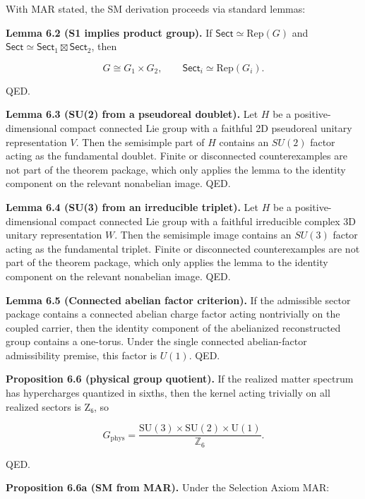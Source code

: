 With MAR stated, the SM derivation proceeds via standard lemmas:

\textbf{Lemma 6.2 (S1 implies product group).} If \(\mathsf{Sect} \simeq \mathrm{Rep}(G)\) and \(\mathsf{Sect} \simeq \mathsf{Sect}_1 \boxtimes \mathsf{Sect}_2\), then

\[
G \cong G_1 \times G_2,
\qquad
\mathsf{Sect}_i \simeq \mathrm{Rep}(G_i).
\]

QED.

\textbf{Lemma 6.3 (SU(2) from a pseudoreal doublet).} Let \(H\) be a positive-dimensional compact connected Lie group with a faithful 2D pseudoreal unitary representation \(V\). Then the semisimple part of \(H\) contains an \(SU(2)\) factor acting as the fundamental doublet. Finite or disconnected counterexamples are not part of the theorem package, which only applies the lemma to the identity component on the relevant nonabelian image. QED.

\textbf{Lemma 6.4 (SU(3) from an irreducible triplet).} Let \(H\) be a positive-dimensional compact connected Lie group with a faithful irreducible complex 3D unitary representation \(W\). Then the semisimple image contains an \(SU(3)\) factor acting as the fundamental triplet. Finite or disconnected counterexamples are not part of the theorem package, which only applies the lemma to the identity component on the relevant nonabelian image. QED.

\textbf{Lemma 6.5 (Connected abelian factor criterion).} If the admissible sector package contains a connected abelian charge factor acting nontrivially on the coupled carrier, then the identity component of the abelianized reconstructed group contains a one-torus. Under the single connected abelian-factor admissibility premise, this factor is \(U(1)\). QED.

\textbf{Proposition 6.6 (physical group quotient).} If the realized matter spectrum has hypercharges quantized in sixths, then the kernel acting trivially on all realized sectors is Z₆, so

\[
G_{\mathrm{phys}} = \frac{\mathrm{SU}(3)\times \mathrm{SU}(2)\times \mathrm{U}(1)}{\mathbb Z_6}.
\]

QED.

\textbf{Proposition 6.6a (SM from MAR).} Under the Selection Axiom MAR:

